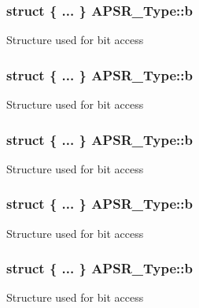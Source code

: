 \subsubsection[{\texorpdfstring{b}{b}}]{\setlength{\rightskip}{0pt plus 5cm}struct \{ ... \}   A\+P\+S\+R\+\_\+\+Type\+::b}\hypertarget{unionAPSR__Type_a598a04a982e979ecc0d55fc6c1d4a2d6}{}\label{unionAPSR__Type_a598a04a982e979ecc0d55fc6c1d4a2d6}
Structure used for bit access 
\subsubsection[{\texorpdfstring{b}{b}}]{\setlength{\rightskip}{0pt plus 5cm}struct \{ ... \}   A\+P\+S\+R\+\_\+\+Type\+::b}\hypertarget{unionAPSR__Type_ac5743179302d4d93d913f963b9c1d26b}{}\label{unionAPSR__Type_ac5743179302d4d93d913f963b9c1d26b}
Structure used for bit access 
\subsubsection[{\texorpdfstring{b}{b}}]{\setlength{\rightskip}{0pt plus 5cm}struct \{ ... \}   A\+P\+S\+R\+\_\+\+Type\+::b}\hypertarget{unionAPSR__Type_af5f6237182ed81f50fd9cf7669c9a581}{}\label{unionAPSR__Type_af5f6237182ed81f50fd9cf7669c9a581}
Structure used for bit access 
\subsubsection[{\texorpdfstring{b}{b}}]{\setlength{\rightskip}{0pt plus 5cm}struct \{ ... \}   A\+P\+S\+R\+\_\+\+Type\+::b}\hypertarget{unionAPSR__Type_aaf8972e1f4a81818ee4ad5acc6ddb1f0}{}\label{unionAPSR__Type_aaf8972e1f4a81818ee4ad5acc6ddb1f0}
Structure used for bit access 
\subsubsection[{\texorpdfstring{b}{b}}]{\setlength{\rightskip}{0pt plus 5cm}struct \{ ... \}   A\+P\+S\+R\+\_\+\+Type\+::b}\hypertarget{unionAPSR__Type_a57fde0b8cbbaaba67bf0fbac8a235126}{}\label{unionAPSR__Type_a57fde0b8cbbaaba67bf0fbac8a235126}
Structure used for bit access 
